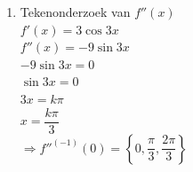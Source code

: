 \documentclass[a4paper]{article}
\begin{document}
\begin{enumerate}
$3\cos 3x=0$\\

$\cos 3x=0$\\

$3x=\dfrac{\pi}{2}+k\pi $\\

$x=\dfrac{\pi}{6}+\dfrac{k\pi}{3} $\\

$\Rightarrow f'^{(-1)}(0)=\left\{\dfrac{\pi}{6},\dfrac{\pi}{2}\right\}$\\

\begin{tabular}{c|ccccc}
$x$ & $0$ & $\dfrac{\pi}{6}$ &  & $\dfrac{\pi}{2}$ & \\ \hline
$f'(x)$ & $+$ & $0$ & $-$ & $0$ & $+$
\end{tabular}\\

$M\left(\dfrac{\pi}{6}\right)=\sin \left(3\cdot\dfrac{\pi}{6}\right)$\\

$M\left(\dfrac{\pi}{6}\right)=1$\\

$\Rightarrow M\left(\dfrac{\pi}{6},1\right)$\\

$m\left(\dfrac{\pi}{2}\right)=\sin \left(3\cdot\dfrac{\pi}{2}\right)$\\

$m\left(\dfrac{\pi}{2}\right)=-1$\\

$\Rightarrow m\left(\dfrac{\pi}{2},-1\right)$\\


\item Tekenonderzoek van $f''(x)$\\

$f'(x)=3\cos 3x$\\

$f''(x)=-9\sin 3x$\\

$-9\sin 3x=0$\\

$\sin 3x=0$\\

$3x=k\pi$\\

$x=\dfrac{k\pi}{3}$\\

$\Rightarrow f''^{(-1)}(0)=\left\{0,\dfrac{\pi}{3},\dfrac{2\pi}{3}\right\}$\\


\end{enumerate}
\end{document}
